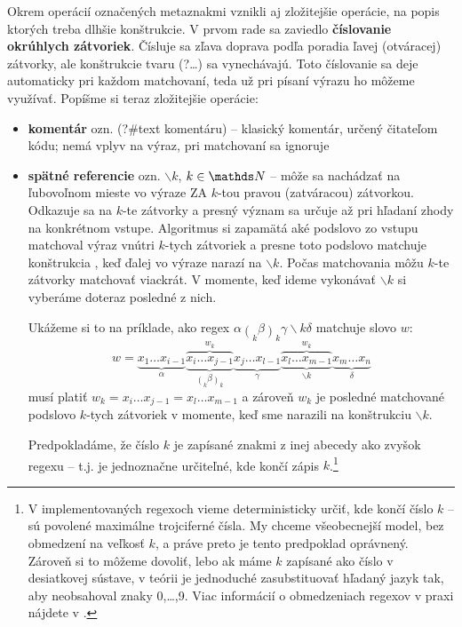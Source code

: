 Okrem operácií označených metaznakmi vznikli aj zložitejšie operácie, na popis ktorých treba dlhšie konštrukcie. V prvom rade sa zaviedlo \textbf{číslovanie okrúhlych zátvoriek}. Čísluje sa zľava doprava podľa poradia ľavej (otváracej) zátvorky, ale konštrukcie tvaru (?\dots) sa vynechávajú. Toto číslovanie sa deje automaticky pri každom matchovaní, teda už pri písaní výrazu ho môžeme využívať. Popíšme si teraz zložitejšie operácie:

\begin{itemize}
\item \textbf{komentár} ozn. (?\#text komentáru) -- klasický komentár, určený čitateľom kódu; nemá vplyv na výraz, pri matchovaní sa ignoruje
\item \textbf{spätné referencie} ozn. $\backslash k$, $k \in\N$ -- môže sa nachádzať na ľubovoľnom mieste vo výraze ZA $k$-tou pravou (zatváracou) zátvorkou. Odkazuje sa na $k$-te zátvorky a presný význam sa určuje až pri hľadaní zhody na konkrétnom vstupe. Algoritmus si zapamätá aké podslovo zo vstupu matchoval výraz vnútri $k$-tych zátvoriek a presne toto podslovo matchuje konštrukcia , keď ďalej vo výraze narazí na $\backslash k$. Počas matchovania môžu $k$-te zátvorky matchovať viackrát. V momente, keď ideme vykonávať $\backslash k$ si vyberáme doteraz posledné z nich.

Ukážeme si to na príklade, ako regex $\displaystyle \alpha\mathop{(}_k\beta\mathop{)}_k\gamma\backslash k\delta$ matchuje slovo $w$:
$$w = \underbrace{x_1\dots x_{i-1}}_\alpha 
 \overbrace{\underbrace{x_i\dots x_{j-1}}_{ \displaystyle{\mathop(_k\beta \mathop)_k}}}^{w_k} 
 \underbrace{x_j\dots x_{l-1}}_\gamma 
 \overbrace{\underbrace{x_l\dots x_{m-1}}_{\backslash k}}^{w_k}
 \underbrace{x_{m}\dots x_{n}}_\delta$$
musí platiť $w_k= x_i\dots x_{j-1} = x_l\dots x_{m-1} $ a zároveň $w_k$ je posledné matchované podslovo $k$-tych zátvoriek v momente, keď sme narazili na konštrukciu $\backslash k$.


Predpokladáme, že číslo $k$ je zapísané znakmi z inej abecedy ako zvyšok regexu -- t.j. je jednoznačne určiteľné, kde končí zápis $k$.\footnote{V implementovaných regexoch vieme deterministicky určiť, kde končí číslo $k$ -- sú povolené maximálne trojciferné čísla. My chceme všeobecnejší model, bez obmedzení na veľkosť $k$, a práve preto je tento predpoklad oprávnený. Zároveň si to môžeme dovoliť, lebo ak máme $k$ zapísané ako číslo v desiatkovej sústave, v teórii je jednoduché zasubstituovať hľadaný jazyk tak, aby neobsahoval znaky 0,\dots,9. Viac informácií o obmedzeniach regexov v praxi nájdete v \cite[kapitola Prax]{mojaBak}.}


\end{itemize}
